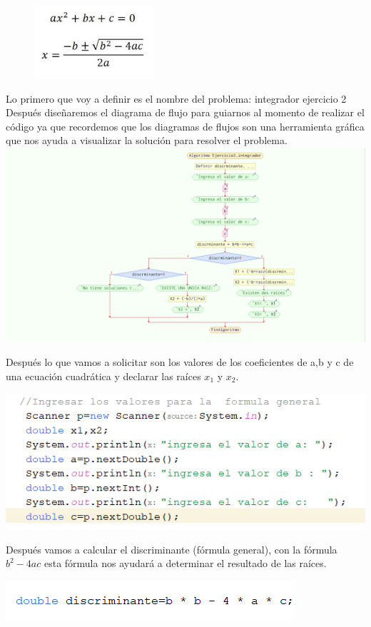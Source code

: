 \documentclass{IEEEcsmag}
\begin{document}
\begin{enumerate}
    \begin{figure}
    \centerline {\includegraphics[width=10.5pc]{./latex_imagenes/Img_ejer2_1.jpg}}
    \end{figure}

    Lo primero que voy a definir es el nombre del problema: integrador ejercicio 2 \\
    Después diseñaremos el diagrama de flujo para guiarnos al momento de realizar el código ya que recordemos que los diagramas de flujos son una herramienta  gráfica que nos ayuda a visualizar  la solución para resolver el problema.
        \centering
        \includegraphics[width=0.5\linewidth]{./latex_imagenes/Diagrama_Integrador.png}
    
    Después lo que  vamos a solicitar son  los valores  de los coeficientes de a,b y c de una ecuación cuadrática y declarar las raíces $x_{1}$ y $x_{2}$.

 
        \centering
        \includegraphics[width=0.5\linewidth]{./latex_imagenes/valores.png}
    
    Después vamos a calcular el discriminante (fórmula general),  con la fórmula  \(b^2 - 4ac\) esta fórmula nos ayudará a determinar el resultado de las raíces.
    
        \centering
        \includegraphics[width=0.5\linewidth]{./latex_imagenes/discrminante.png}
    

\end{enumerate}
\end{document}
